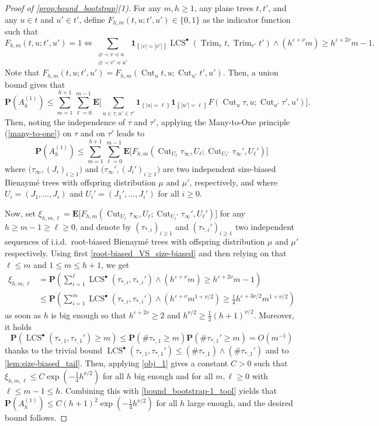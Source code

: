 \documentclass[11pt,reqno]{amsart}
\newcommand{\1}{\mathbf{1}}
\newcommand{\0}{\mathbf{0}}
\newcommand{\e}{\varepsilon}
\newcommand{\E}{{\mathbf E}}
\newcommand{\I}[1]{{\mathbf 1}_{\left\{#1\right\}}}
\newcommand{\prob}{\mathbf{P}}
\newcommand{\Cut}{\operatorname{Cut}}
\newcommand{\Trim}{\operatorname{Trim}}
\newcommand{\LCS}{\operatorname{LCS}}
\begin{document}
\begin{proof}[Proof of \cref{prop:bound_bootstrap}(1)]
    For any $m,h\geq 1$, any plane trees $t,t'$, and any $u\in t$ and $u'\in t'$, define $F_{h,m}(t,u;t',u')\in\{0,1\}$ as the indicator function such that 
    \[F_{h,m}(t,u;t',u')=1 \Longleftrightarrow \sum_{\substack{\varnothing\prec v\preceq u\\ \varnothing\prec v'\preceq u'}}\I{|v|=|v'|}\LCS^\bullet(\Trim_v t,\Trim_{v'} t')\wedge (h^{\varepsilon+\nu} m)\geq h^{\varepsilon+2\nu}m-1.\]
    Note that $F_{h,m}(t,u;t',u')=F_{h,m}(\Cut_u t,u;\Cut_{u'} t',u')$. Then, a union bound gives that
    \[\prob(A_h^{(1)})\leq \sum_{m=1}^{h+1}\sum_{\ell=0}^{m-1}\E\bigg[\sum_{u\in\tau, u'\in\tau'}\I{|u|=\ell}\I{|u'|=\ell}F(\Cut_u \tau,u;\Cut_{u'} \tau',u')\bigg].\]
    Then, noting the independence of $\tau$ and $\tau'$, applying the Many-to-One principle (\cref{many-to-one}) on $\tau$ and on $\tau'$ leads to
    \begin{equation}
\label{bound_bootstrap-1_tool}
    \prob(A_h^{(1)}) \leq \sum_{m=1}^{h+1} \sum_{\ell=0}^{m-1}\E\big[F_{h,m}(\Cut_{U_\ell}\tau_\infty,U_\ell;\Cut_{U_\ell'}\tau_\infty',U_\ell')\big]
    \end{equation}
    where $\big(\tau_\infty,(J_i)_{i\geq 1}\big)$ and $\big(\tau_\infty',(J_i')_{i\geq 1}\big)$ are two independent size-biased Bienaym\'{e} trees with offspring distribution $\mu$ and $\mu'$, respectively, and where $U_i = (J_1,\ldots,J_i)$ and $U_i' = (J_1',\ldots,J_i')$ for all $i\geq 0$.
    
    Now, set $\xi_{h,m,\ell}=\E\big[F_{h,m}(\Cut_{U_\ell}\tau_\infty,U_\ell;\Cut_{U_\ell'}\tau_\infty',U_\ell')\big]$ for any $h\geq m-1\geq \ell\geq 0$, and denote by $(\tau_{*,i})_{i\geq 1}$ and $(\tau_{*,i}')_{i\geq 1}$ two independent sequences of i.i.d.~root-biased Bienaym\'{e} trees with offspring distribution $\mu$ and $\mu'$ respectively. Using first \cref{root-biased_VS_size-biased} and then relying on that $\ell\leq m$ and $1\leq m \leq h+1$, we get
    \begin{align*}
    \xi_{h,m,\ell}&=\prob\left(\sum_{i=1}^\ell \LCS^\bullet(\tau_{*,i},\tau_{*,i}')\wedge  (h^{\e + \nu} m) \geq h^{\e + 2\nu}m-1\right)\\
    &\leq \prob\left(\sum_{i=1}^m \LCS^\bullet(\tau_{*,i},\tau_{*,i}')\wedge  (h^{\e + \nu} m^{1+\nu/2}) \geq \tfrac{1}{4}h^{\e + 3\nu/2}m^{1+\nu/2}\right)
    \end{align*}
    as soon as $h$ is big enough so that $h^{\varepsilon+2\nu}\geq 2$ and $h^{\nu/2}\geq \tfrac{1}{2}(h+1)^{\nu/2}$. Moreover, it holds
    \[\prob(\LCS^\bullet(\tau_{*,1}, \tau_{*,1}') \geq m) \leq \prob(\#\tau_{*,1}\geq m)\prob(\#\tau_{*,1}' \geq m) = O(m^{-1})\]
    thanks to the trivial bound $\LCS^\bullet(\tau_{*,1}, \tau_{*,1}')\leq (\#\tau_{*,1})\wedge (\#\tau_{*,1}')$ and to \cref{lem:size-biased_tail}. Then, applying \cref{obj_1} gives a constant $C > 0$ such that $\xi_{h,m,\ell}\leq C\exp(-\tfrac{1}{4}h^{\nu/2})$ for all $h$ big enough and for all $m,\ell\geq 0$ with $\ell\leq m-1\leq h$. Combining this with \eqref{bound_bootstrap-1_tool} yields that $\prob(A_h^{(1)})\leq C (h+1)^2 \exp(-\tfrac{1}{4}h^{\nu/2})$ for all $h$ large enough, and the desired bound follows.
\end{proof}
\end{document}
